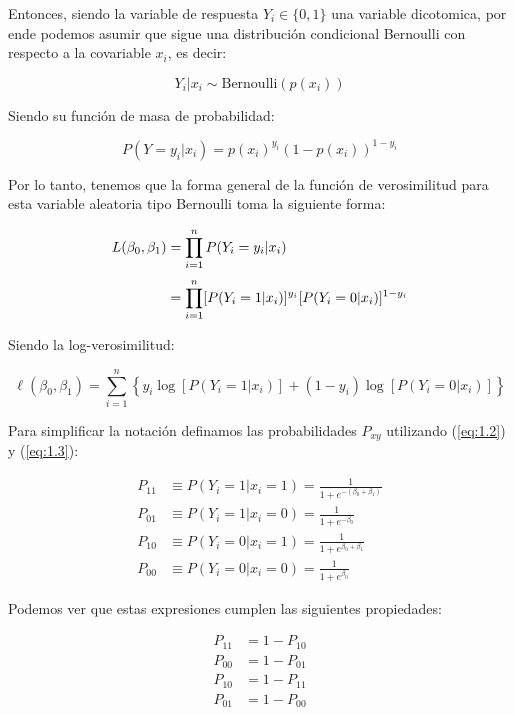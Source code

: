 Entonces, siendo la variable de respuesta $Y_i \in \{0,1\}$ una variable dicotomica, por ende podemos asumir que sigue una distribución condicional Bernoulli con respecto a la covariable $x_i$, es decir:

\begin{equation*}
    Y_i|x_i \sim \text{Bernoulli}(p(x_i))
\end{equation*}

Siendo su función de masa de probabilidad:

\begin{equation*}
    P(Y=y_i|x_i)=p(x_i)^{y_i}(1-p(x_i))^{1-y_{i}}
\end{equation*}

Por lo tanto, tenemos que la forma general de la función de verosimilitud para esta variable aleatoria tipo Bernoulli toma la siguiente forma:

\begin{align}
    L(\beta_0,\beta_1) &= \prod_{i=1}^n P(Y_i=y_i|x_i) \notag \\[0.1cm]
    &= \prod_{i=1}^n [P(Y_i=1|x_i)]^{y_i}[P(Y_i=0|x_i)]^{1-y_i}
    \label{eq:1.4}
\end{align}

Siendo la log-verosimilitud:

\begin{equation}
    \ell(\beta_0,\beta_1)=\sum_{i=1}^n \left\{y_i \log[P(Y_i=1|x_i)] + (1-y_i) \log[P(Y_i=0|x_i)]\right\}
    \label{eq:1.5}
\end{equation}

Para simplificar la notación definamos las probabilidades $P_{xy}$ utilizando (\ref{eq:1.2}) y (\ref{eq:1.3}):

\begin{align}
    P_{11} &\equiv P(Y_i=1|x_i=1)= \frac{1}{1 + e^{-(\beta_0 + \beta_1)}}
    \label{eq:1.6} \\[0.1cm]
    P_{01} &\equiv P(Y_i=1|x_i=0)= \frac{1}{1 + e^{-\beta_0}} \label{eq:1.7} \\[0.1cm]
    P_{10} &\equiv P(Y_i=0|x_i=1)= \frac{1}{1+e^{\beta_0 + \beta_1}} \label{eq:1.8} \\[0.1cm]
    P_{00} &\equiv P(Y_i=0|x_i=0)= \frac{1}{1+e^{\beta_0}} 
    \label{eq:1.9}
\end{align}

Podemos ver que estas expresiones cumplen las siguientes propiedades:

\begin{align}
    P_{11} &= 1-P_{10} \label{eq:1.10} \\[0.1cm]
    P_{00} &= 1-P_{01} \label{eq:1.11} \\[0.1cm]
    P_{10} &= 1-P_{11} \label{eq:1.12} \\[0.1cm]
    P_{01} &= 1-P_{00} \label{eq:1.13}
\end{align}

